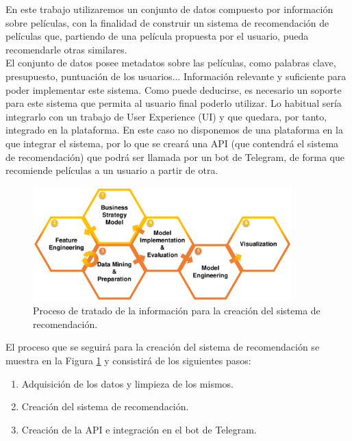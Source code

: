 En este trabajo utilizaremos un conjunto de datos compuesto por información sobre películas, con la finalidad de construir un sistema de recomendación de películas que, partiendo de una película propuesta por el usuario, pueda recomendarle otras similares.\\

El conjunto de datos posee metadatos sobre las películas, como palabras clave, presupuesto, puntuación de los usuarios... Información relevante y suficiente para poder implementar este sistema. Como puede deducirse, es necesario un soporte para este sistema que permita al usuario final poderlo utilizar. Lo habitual sería integrarlo con un trabajo de User Experience (UI) y que quedara, por tanto, integrado en la plataforma. En este caso no disponemos de una plataforma en la que integrar el sistema, por lo que se creará una API (que contendrá el sistema de recomendación) que podrá ser llamada por un bot de Telegram, de forma que recomiende películas a un usuario a partir de otra.\\

\begin{figure}[h]
    \centering
    \captionsetup{width=10cm}
    \includegraphics[width=10cm]{contenido/imagenes/DDSD.pdf}
    \caption{Proceso de tratado de la información para la creación del sistema de recomendación.}
    \label{fig:process}
\end{figure}

El proceso que se seguirá para la creación del sistema de recomendación se muestra en la Figura \ref{fig:process} y consistirá de los siguientes pasos:
\begin{enumerate}
    \item Adquisición de los datos y limpieza de los mismos.
    \item Creación del sistema de recomendación.
    \item Creación de la API e integración en el bot de Telegram.
\end{enumerate}


